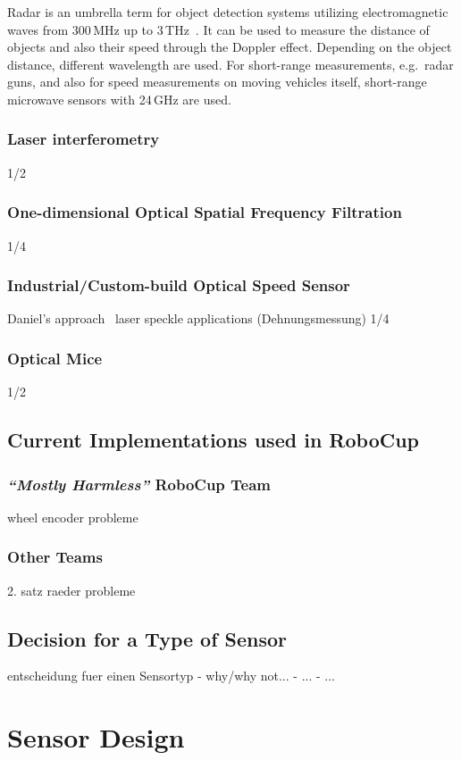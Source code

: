 \documentclass[12pt,a4paper]{article}
\newcommand{\MH}{\emph{``Mostly Harmless''} RoboCup Team\xspace}
\begin{document}
Radar is an umbrella term for object detection systems utilizing electromagnetic waves from 300\,MHz up to 3\,THz~\cite{nrt}.
It can be used to measure the distance of objects and also their speed through the Doppler effect.
Depending on the object distance, different wavelength are used.
For short-range measurements, e.g.\ radar guns, and also for speed measurements on moving vehicles itself, short-range microwave sensors with 24\,GHz are used.~\cite{s_r_radar}

\subsubsection{Laser interferometry}
1/2
\subsubsection{One-dimensional Optical Spatial Frequency Filtration}
1/4
\subsubsection{Industrial/Custom-build Optical Speed Sensor}
        Daniel's approach~\cite{Hrach2006}
        laser speckle applications (Dehnungsmessung) 
1/4
\subsubsection{Optical Mice}
1/2

\subsection{Current Implementations used in RoboCup}

\subsubsection{\MH}
      wheel encoder
        probleme
\subsubsection{Other Teams}
      2. satz raeder
        probleme


\subsection{Decision for a Type of Sensor}
  entscheidung fuer einen Sensortyp
    - why/why not...
    - ...
    - ...


\section{Sensor Design}
\end{document}
